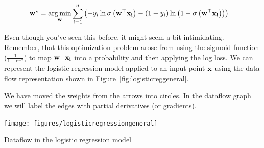 \documentclass[assignment06_Solutions]{subfiles}
\begin{document}
\begin{align}
\mathbf{w^\star} &= \operatorname*{arg\,min}_{\mathbf{w}} \sum_{i=1}^n \left ( -y_i \ln \sigma\left (\mathbf{w}^\top \mathbf{x_i} \right) - (1-y_i) \ln \left ( 1 - \sigma\left (\mathbf{w}^\top \mathbf{x_i} \right) \right) \right)
\end{align}

Even though you've seen this before, it might seem a bit intimidating.  Remember, that this optimization problem arose from using the sigmoid function ($\frac{1}{1+e^{-x}}$) to map $\mathbf{w}^\top \mathbf{x_i}$ into a probability and then applying the log loss.  We can represent the logistic regression model applied to an input point $\mathbf{x}$ using the data flow representation shown in Figure~\ref{fig:logisticreggeneral}.
\begin{notice}
We have moved the weights from the arrows into circles.  In the dataflow graph we will label the edges with partial derivatives (or gradients).
\end{notice}
\begin{marginfigure}
\texttt{[image: figures/logisticregressiongeneral]}
\caption{Dataflow in the logistic regression model}\label{fig:logisticreggeneral}
\end{marginfigure}
\end{document}
